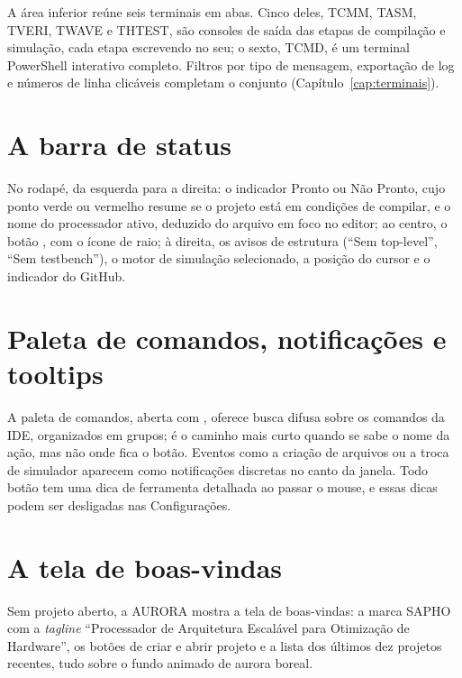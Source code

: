 A área inferior reúne seis terminais em abas. Cinco deles, TCMM, TASM, TVERI, TWAVE e THTEST, são consoles de saída das etapas de compilação e simulação, cada etapa escrevendo no seu; o sexto, TCMD, é um terminal PowerShell interativo completo. Filtros por tipo de mensagem, exportação de log e números de linha clicáveis completam o conjunto (Capítulo~\ref{cap:terminais}).

\section{A barra de status}

No rodapé, da esquerda para a direita: o indicador Pronto ou Não Pronto, cujo ponto verde ou vermelho resume se o projeto está em condições de compilar, e o nome do processador ativo, deduzido do arquivo \cmm{} em foco no editor; ao centro, o botão , com o ícone de raio; à direita, os avisos de estrutura (\enquote{Sem top-level}, \enquote{Sem testbench}), o motor de simulação selecionado, a posição do cursor e o indicador do GitHub.

\section{Paleta de comandos, notificações e tooltips}

A paleta de comandos, aberta com , oferece busca difusa sobre os comandos da IDE, organizados em grupos; é o caminho mais curto quando se sabe o nome da ação, mas não onde fica o botão. Eventos como a criação de arquivos ou a troca de simulador aparecem como notificações discretas no canto da janela. Todo botão tem uma dica de ferramenta detalhada ao passar o mouse, e essas dicas podem ser desligadas nas Configurações.

\section{A tela de boas-vindas}

Sem projeto aberto, a AURORA mostra a tela de boas-vindas: a marca SAPHO com a \textit{tagline} \enquote{Processador de Arquitetura Escalável para Otimização de Hardware}, os botões de criar e abrir projeto e a lista dos últimos dez projetos recentes, tudo sobre o fundo animado de aurora boreal.
